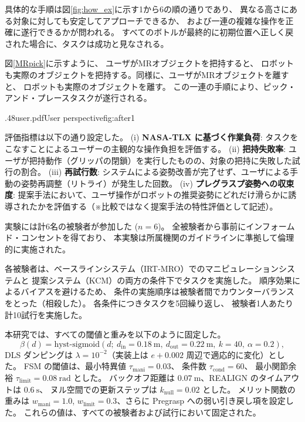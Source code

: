 \documentclass[../../main.tex]{subfiles} %
\begin{document}

具体的な手順は図\ref{fig:how_ex}に示す1から6の順の通りであり、
異なる高さにある対象に対しても安定してアプローチできるか、
および一連の複雑な操作を正確に遂行できるかが問われる。
すべてのボトルが最終的に初期位置へ正しく戻された場合に、タスクは成功と見なされる。


図\ref{MRpick}に示すように、
ユーザがMRオブジェクトを把持すると、
ロボットも実際のオブジェクトを把持する。同様に、ユーザがMRオブジェクトを離すと、
ロボットも実際のオブジェクトを離す。
この一連の手順により、ピック・アンド・プレースタスクが遂行される。

  {.48\linewidth}{user.pdf}{User perspective}{fig:after1}
\label{MRpick}

評価指標は以下の通り設定した。
(i) \textbf{NASA-TLX に基づく作業負荷}: タスクをこなすことによるユーザーの主観的な操作負担を評価する。
(ii) \textbf{把持失敗率}: ユーザが把持動作（グリッパの閉鎖）を実行したものの、対象の把持に失敗した試行の割合。
(iii) \textbf{再試行数}: システムによる姿勢改善が完了せず、ユーザによる手動の姿勢再調整（リトライ）が発生した回数。
(iv) \textbf{プレグラスプ姿勢への収束度}: 提案手法において、ユーザ操作がロボットの推奨姿勢にどれだけ滑らかに誘導されたかを評価する（※比較ではなく提案手法の特性評価として記述）。

実験には計6名の被験者が参加した ($n=6$)。
全被験者から事前にインフォームド・コンセントを得ており、
本実験は所属機関のガイドラインに準拠して倫理的に実施された。

各被験者は、ベースラインシステム（IRT-MRO）でのマニピュレーションシステムと
提案システム（KCM）の両方の条件下でタスクを実施した。
順序効果によるバイアスを避けるため、
条件の実施順序は被験者間でカウンターバランスをとった（相殺した）。
各条件につきタスクを5回繰り返し、
被験者1人あたり計10試行を実施した。

本研究では、すべての閾値と重みを以下のように固定した。
\[
\beta(d)=\mathrm{hyst\text{-}sigmoid}(d;\ d_{\mathrm{in}}{=}0.18\ \mathrm{m},\ d_{\mathrm{out}}{=}0.22\ \mathrm{m},\ k{=}40,\ \alpha{=}0.2),
\]
DLS ダンピングは $\lambda=10^{-2}$（実装上は $e+0.002$ 周辺で適応的に変化）とした。
FSM の閾値は、最小特異値 $\tau_{\text{mani}}=0.03$、
条件数 $\tau_{\text{cond}}=60$、
最小関節余裕 $\tau_{\text{limit}}=0.08\ \mathrm{rad}$ とした。
バックオフ距離は $0.07\ \mathrm{m}$、REALIGN のタイムアウトは $0.6\ \mathrm{s}$、
ヌル空間での更新ステップは $k_{\text{null}}=0.02$ とした。
メリット関数の重みは $w_{\text{mani}}=1.0$, $w_{\text{limit}}=0.3$、さらに Pregrasp への弱い引き戻し項を設定した。
これらの値は、すべての被験者および試行において固定された。
\end{document}
